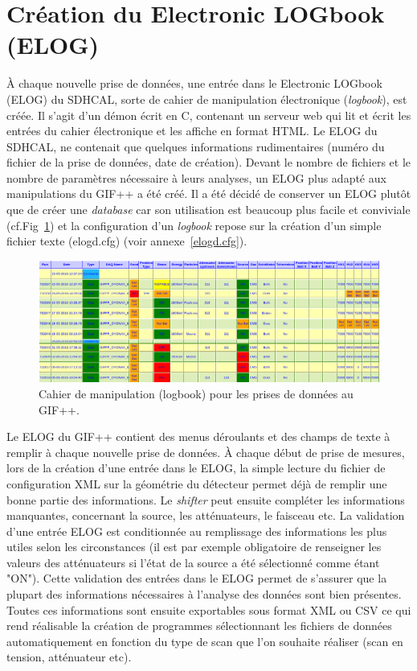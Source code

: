 \section{Création du Electronic LOGbook (ELOG)}
\vspace*{-0.6cm}
À chaque nouvelle prise de données, une entrée dans le Electronic LOGbook (ELOG) \cite{ELOG} du SDHCAL, sorte de cahier de manipulation électronique (\textit{logbook}), est créée. Il s'agit d'un démon écrit en C, contenant un serveur web qui lit et écrit les entrées du cahier électronique et les affiche en format HTML. Le ELOG du SDHCAL, ne contenait que quelques informations rudimentaires (numéro du fichier de la prise de données, date de création). Devant le nombre de fichiers et le nombre de paramètres nécessaire à leurs analyses, un ELOG plus adapté aux manipulations du GIF++ a été créé. Il a été décidé de conserver un ELOG plutôt que de créer une \textit{database} car son utilisation est beaucoup plus facile  et conviviale (cf.Fig~\ref{ELOG}) et la configuration d'un \textit{logbook} repose sur la création d'un simple fichier texte (elogd.cfg) (voir annexe~\ref{elogd.cfg}).

\begin{figure}[!ht]
	\centering
	\includegraphics[width=0.75\linewidth]{GLA/ELOG2.png}
	\caption{Cahier de manipulation (logbook) pour les prises de données au GIF++.}
	\label{ELOG}
\end{figure}

Le ELOG du GIF++ contient des menus déroulants et des champs de texte à remplir à chaque nouvelle prise de données. À chaque début de prise de mesures, lors de la création d'une entrée dans le ELOG, la simple lecture du fichier de configuration XML sur la géométrie du détecteur permet déjà de remplir une bonne partie des informations. Le \textit{shifter} peut ensuite compléter les informations manquantes, concernant la source, les atténuateurs, le faisceau etc. La validation d'une entrée ELOG est conditionnée au remplissage des informations les plus utiles selon les circonstances (il est par exemple obligatoire de renseigner les valeurs des atténuateurs si l'état de la source a été sélectionné comme étant "ON"). Cette validation des entrées dans le ELOG permet de s'assurer que la plupart des informations nécessaires à l'analyse des données sont bien présentes. Toutes ces informations sont ensuite exportables sous format XML ou CSV ce qui rend réalisable la création de programmes sélectionnant les fichiers de données automatiquement en fonction du type de scan que l'on souhaite réaliser (scan en tension, atténuateur etc).
\vspace*{-0.2cm}
